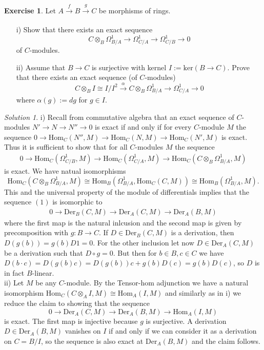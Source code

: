 \documentclass[11pt]{article}
\author{Janos }
\theoremstyle{definition}
\newtheorem{exercise}{Exercise}
\theoremstyle{remark}
\newtheorem*{solution}{Solution}
\begin{document}
\setcounter{exercise}{0}
\begin{exercise}
Let $A\xrightarrow[]{f} B \xrightarrow[]{g} C$ be morphisms of rings.
\begin{enumerate}
\item[i)] Show that there exists an exact sequence 
$$C\otimes_B \Omega_{B/A}^1 \rightarrow \Omega_{C/A}^1\rightarrow \Omega_{C/B}^1 \rightarrow 0$$
of $C$-modules.
\item[ii)] Assume that $B\rightarrow C$ is surjective with kernel $I := \text{ker}(B\rightarrow C)$. Prove that there exists an exact sequence (of $C$-modules)
$$C\otimes_B I \cong I/I^2 \xrightarrow[]{\alpha} C\otimes_B \Omega_{B/A}^1 \rightarrow \Omega_{C/A}^1 \rightarrow 0$$
where $\alpha(g) := dg$ for $g\in I$.
\end{enumerate}
\end{exercise}
\begin{solution}
i) Recall from commutative algebra that an exact sequence of $C$-modules $N'\rightarrow N \rightarrow N'' \rightarrow 0$ is exact if and only if for every $C$-module $M$ the sequence $0 \rightarrow \text{Hom}_C(N'',M)\rightarrow \text{Hom}_C(N,M) \rightarrow \text{Hom}_C(N',M)$ is exact. Thus it is sufficient to show that for all $C$-modules $M$ the sequence
\begin{align}
0\rightarrow\text{Hom}_C(\Omega_{C/B}^1,M)\rightarrow \text{Hom}_C(\Omega_{C/A}^1,M) \rightarrow \text{Hom}_C(C\otimes_B \Omega_{B/A}^1,M)
\end{align}
is exact. We have natual isomorphisms $$\text{Hom}_C(C\otimes_B \Omega_{B/A}^1,M) \cong \text{Hom}_B(\Omega_{B/A}^1,\text{Hom}_C(C,M)) \cong \text{Hom}_B(\Omega_{B/A}^1,M).$$
This and the universal property of the module of differentials implies that the sequence $(1)$ is isomorphic to 
\begin{align*}
0\rightarrow\text{Der}_B(C,M)\rightarrow \text{Der}_A(C,M) \rightarrow \text{Der}_A(B,M)
\end{align*}
where the first map is the natural inlcusion and the second map is given by precomposition with $g : B\rightarrow C$. If $D \in \text{Der}_B(C,M)$ is a derivation, then $D(g(b)) = g(b)D1=0$. For the other inclusion let now $D \in \text{Der}_A(C,M)$ be a derivation such that $D \circ g = 0$. But then for $b\in B, c\in C$ we have $D(b\cdot c) = D(g(b)c) = D(g(b))c+g(b)D(c)=g(b)D(c)$, so $D$ is in fact $B$-linear.\\

ii) Let $M$ be any $C$-module. By the Tensor-hom adjunction we have a natural isomorphism $\text{Hom}_C(C\otimes_A I, M) \cong \text{Hom}_A(I,M)$ and similarly as in i) we reduce the claim to showing that the sequence 
$$0\rightarrow  \text{Der}_A(C,M) \rightarrow \text{Der}_A(B,M) \rightarrow \text{Hom}_A(I,M)$$
is exact. The first map is injective because $g$ is surjective. A derivation $D\in \text{Der}_A(B,M)$ vanishes on $I$ if and only if we can consider it as a derivation on $C = B /I$, so the sequence is also exact at $\text{Der}_A(B,M)$ and the claim follows.
\end{solution}
\end{document}

